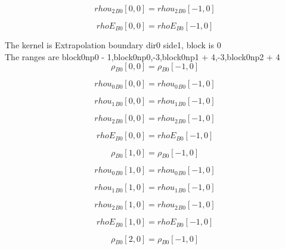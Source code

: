 \documentclass{article}
\begin{document}
\begin{dmath}{rhou_{2}{_{B0}}}[{0,0}] = {rhou_{2}{_{B0}}}[{-1,0}]\end{dmath}

\begin{dmath}{rhoE{_{B0}}}[{0,0}] = {rhoE{_{B0}}}[{-1,0}]\end{dmath}

\noindent The kernel is Extrapolation boundary dir0 side1, block is 0\\\noindent The ranges are block0np0 - 1,block0np0,-3,block0np1 + 4,-3,block0np2 + 4\\\begin{dmath}{\rho{_{B0}}}[{0,0}] = {\rho{_{B0}}}[{-1,0}]\end{dmath}

\begin{dmath}{rhou_{0}{_{B0}}}[{0,0}] = {rhou_{0}{_{B0}}}[{-1,0}]\end{dmath}

\begin{dmath}{rhou_{1}{_{B0}}}[{0,0}] = {rhou_{1}{_{B0}}}[{-1,0}]\end{dmath}

\begin{dmath}{rhou_{2}{_{B0}}}[{0,0}] = {rhou_{2}{_{B0}}}[{-1,0}]\end{dmath}

\begin{dmath}{rhoE{_{B0}}}[{0,0}] = {rhoE{_{B0}}}[{-1,0}]\end{dmath}

\begin{dmath}{\rho{_{B0}}}[{1,0}] = {\rho{_{B0}}}[{-1,0}]\end{dmath}

\begin{dmath}{rhou_{0}{_{B0}}}[{1,0}] = {rhou_{0}{_{B0}}}[{-1,0}]\end{dmath}

\begin{dmath}{rhou_{1}{_{B0}}}[{1,0}] = {rhou_{1}{_{B0}}}[{-1,0}]\end{dmath}

\begin{dmath}{rhou_{2}{_{B0}}}[{1,0}] = {rhou_{2}{_{B0}}}[{-1,0}]\end{dmath}

\begin{dmath}{rhoE{_{B0}}}[{1,0}] = {rhoE{_{B0}}}[{-1,0}]\end{dmath}

\begin{dmath}{\rho{_{B0}}}[{2,0}] = {\rho{_{B0}}}[{-1,0}]\end{dmath}
\end{document}
